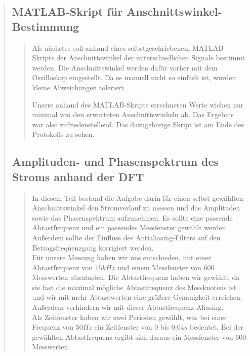 \begin{quote}
\begin{quote}
	\cite{Schaltungwandlerbox}
	\end{quote}
	
	\subsection{MATLAB-Skript für Anschnittswinkel-Bestimmung}
	\begin{quote}	
	Als nächstes soll anhand eines selbstgeschriebenem MATLAB-Skripts der
	Anschnittswinkel der unterschiedlichen Signale bestimmt werden. Die
	Anschnittswinkel werden dafür vorher mit dem Oszilloskop eingestellt. Da es
	manuell nicht so einfach ist, wurden kleine Abweichungen toleriert.
	
	Unsere anhand des MATLAB-Skripts errechneten Werte wichen nur minimal von den
	erwarteten Anschnittswinkeln ab. Das Ergebnis war also zufriedenstellend. 
    Das dazugehörige Skript ist am Ende des Protokolls zu sehen.
   	\end{quote}
	
	\subsection{Amplituden- und Phasenspektrum des Stroms anhand der DFT}
	\begin{quote}
        In diesem Teil bestand die Aufgabe darin für einen selbst gewählten Anschnittswinkel den Stromverlauf
        zu messen und das Amplituden sowie das Phasenspektrum aufzunehmen. Es sollte eine passende Abtastfrequenz und
        ein passendes Messfenster gewählt werden. Außerdem sollte der Einfluss des Antialiasing-Filters auf den
        Betragsfrequenzgang korrigiert werden.\\
        Für unsere Messung haben wir uns entschieden, mit einer Abtastfrequenz
        von $15kHz$ und einem Messfenster von $600$ Messwerten abzutasten. Die
        Abtastfrequenz haben wir gewählt, da sie fast die maximal mögliche Abtastfrequenz des Messknotens ist und wir mit 
        mehr Abtastwerten eine größere Genauigkeit erreichen. Außerdem verhindern wir mit dieser Abtastfrequenz
        Aliasing.\\
        Als Zeitfenster haben wir zwei Perioden gewählt, was bei einer Frequenz von $50Hz$ ein Zeitfenster
        von $0$ bis $0.04 s$ bedeutet. Bei der gewählten Abtastfrequenz ergibt sich daraus ein Messfenster von $600$
        Messwerten.
        
        \vspace{1em}
        

\end{quote}
\end{quote}
